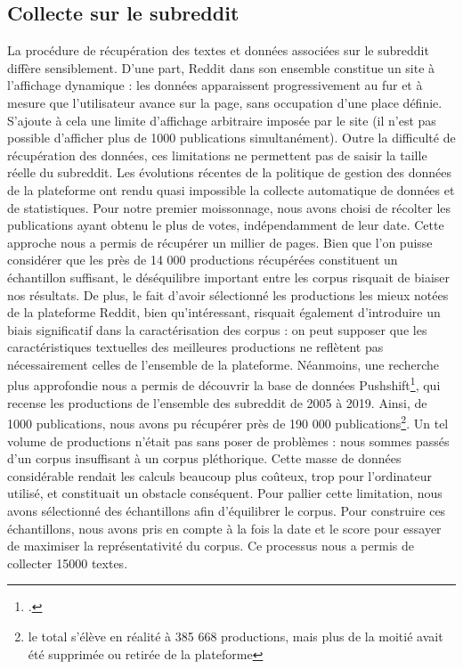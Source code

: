 \documentclass[12pt,a4paper,oneside,titlepage]{book} %
\begin{document}
\subsection{Collecte sur le subreddit}
La procédure de récupération des textes et données associées sur le subreddit diffère sensiblement. D'une part, Reddit dans son ensemble constitue un site à l'affichage dynamique : les données apparaissent progressivement au fur et à mesure que l'utilisateur avance sur la page, sans occupation d'une place définie. S'ajoute à cela une limite d'affichage arbitraire imposée par le site (il n'est pas possible d'afficher plus de 1000 publications simultanément).
Outre la difficulté de récupération des données, ces limitations ne permettent pas de saisir la taille réelle du subreddit. Les évolutions récentes de la politique de gestion des données de la plateforme ont rendu quasi impossible la collecte automatique de données et de statistiques.
Pour notre premier moissonnage, nous avons choisi de récolter les publications ayant obtenu le plus de votes, indépendamment de leur date. Cette approche nous a permis de récupérer un millier de pages.
Bien que l'on puisse considérer que les près de 14 000 productions récupérées constituent un échantillon suffisant, le déséquilibre important entre les corpus risquait de biaiser nos résultats. De plus, le fait d'avoir sélectionné les productions les mieux notées de la plateforme Reddit, bien qu'intéressant, risquait également d'introduire un biais significatif dans la caractérisation des corpus : on peut supposer que les caractéristiques textuelles des meilleures productions ne reflètent pas nécessairement celles de l'ensemble de la plateforme.
Néanmoins, une recherche plus approfondie nous a permis de découvrir la base de données Pushshift\footcite{baumgartner_pushshift_2020}, qui recense les productions de l'ensemble des subreddit de 2005 à 2019. Ainsi, de 1000 publications, nous avons pu récupérer près de 190 000 publications\footnote{ le total s'élève en réalité à 385 668 productions, mais plus de la moitié avait été supprimée ou retirée de la plateforme}.
Un tel volume de productions n'était pas sans poser de problèmes : nous sommes passés d'un corpus insuffisant à un corpus pléthorique. Cette masse de données considérable rendait les calculs beaucoup plus coûteux, trop pour l'ordinateur utilisé, et constituait un obstacle conséquent. Pour pallier cette limitation, nous avons sélectionné des échantillons afin d'équilibrer le corpus. Pour construire ces échantillons, nous avons pris en compte à la fois la date et le score pour essayer de maximiser la représentativité du corpus. Ce processus nous a permis de collecter 15000 textes.
\end{document}
